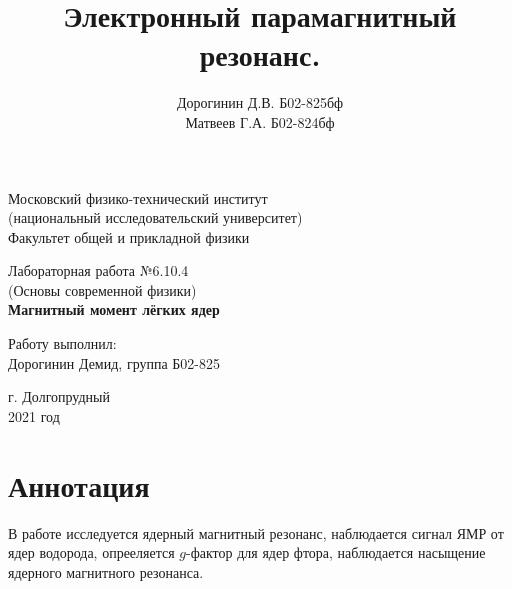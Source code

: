 \documentclass[a4paper,12pt]{article}
\date{\vspace{-10pt}}
\author{Дорогинин Д.В. Б02-825бф\\
Матвеев Г.А. Б02-824бф}
\title{\textbf{Электронный парамагнитный резонанс.}}
\theoremstyle{definition}
\begin{document}
\begin{titlepage}
	\begin{center}
		\large 	Московский физико-технический институт \\
		(национальный исследовательский университет) \\
		Факультет общей и прикладной физики \\
		\vspace{0.2cm}
		
		\vspace{4.5cm}
		Лабораторная работа №6.10.4  \\ \vspace{0.2cm}
		\large (Основы современной физики) \\ \vspace{0.2cm}
		\LARGE \textbf{ Магнитный момент лёгких ядер }
	\end{center}
	\vspace{2.3cm} \large
	
	\begin{center}
		Работу выполнил: \\
		Дорогинин Демид,
		группа Б02-825
		\vspace{10mm}			
	\end{center}
		
	\begin{center} \vspace{60mm}
		г. Долгопрудный \\
		2021 год
	\end{center}
\end{titlepage}


\section*{Аннотация}
В работе исследуется ядерный магнитный резонанс, наблюдается сигнал ЯМР от ядер водорода, опрееляется $g$-фактор для ядер фтора, наблюдается насыщение ядерного магнитного резонанса.
\end{document}
